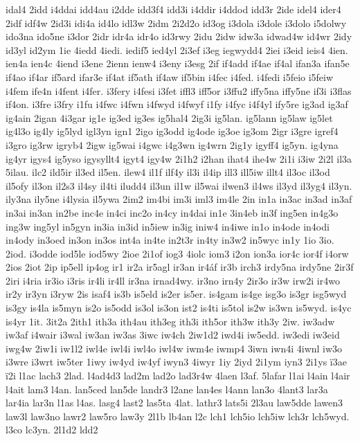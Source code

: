 {idal4
2idd
i4ddai
idd4au
i2dde
idd3f4
idd3i
i4ddir
i4ddod
idd3r
2ide
idel4
ider4
2idf
idf4w
2id3i
idi4a
id4lo
idl3w
2idm
2i2d2o
id3og
i3dola
i3dole
i3dolo
i5dolwy
ido3na
ido5ne
i3dor
2idr
idr4a
idr4o
id3rwy
2idu
2idw
idw3a
idwad4w
id4wr
2idy
id3yl
id2ym
1ie
4iedd
4iedi.
iedif5
ied4yl
2i3ef
i3eg
iegwydd4
2iei
i3eid
ieis4
4ien.
ien4a
ien4c
4iend
i3ene
2ienn
ienw4
i3eny
i3esg
2if
if4add
if4ae
if4al
ifan3a
ifan5e
if4ao
if4ar
if5ard
ifar3e
if4at
if5ath
if4aw
if5bin
i4fec
i4fed.
i4fedi
i5feio
i5feiw
i4fem
ife4n
i4fent
i4fer.
i3fery
i4fesi
i3fet
iffl3
iff5or
i3ffu2
iffy5na
iffy5ne
if3i
i3flas
if4on.
i3fre
i3fry
i1fu
i4fwc
i4fwn
i4fwyd
i4fwyf
i1fy
i4fyc
i4f4yl
ify5re
ig3ad
ig3af
ig4ain
2igan
4i3gar
ig1e
ig3ed
ig3es
ig5hal4
2ig3i
ig5lan.
ig5lann
ig5law
ig5let
ig4l3o
ig4ly
ig5lyd
igl3yn
ign1
2igo
ig3odd
ig4ode
ig3oe
ig3om
2igr
i3gre
igref4
i3gro
ig3rw
igryb4
2igw
ig5wai
i4gwc
i4g3wn
ig4wrn
2ig1y
igyff4
ig5yn.
ig4yna
ig4yr
igys4
ig5yso
igysyllt4
igyt4
igy4w
2i1h2
i2han
ihat4
ihe4w
2i1i
i3iw
2i2l
il3a
5ilau.
ilc2
ild5ir
il3ed
il5en.
ilew4
il1f
ilf4y
il3i
il4ip
ill3
ill5iw
illt4
il3oc
il3od
il5ofy
il3on
il2s3
il4sy
il4ti
iludd4
il3un
il1w
il5wai
ilwen3
il4ws
il3yd
il3yg4
il3yn.
ily3na
ily5ne
i4lysia
il5ywa
2im2
im4bi
im3i
iml3
im4le
2in
in1a
in3ac
in3ad
in3af
in3ai
in3an
in2be
inc4e
in4ci
inc2o
in4cy
in4dai
in1e
3in4eb
in3f
ing5en
in4g3o
ing3w
ing5yl
in5gyn
in3ia
in3id
in5iew
in3ig
iniw4
in4iwe
in1o
in4ode
in4odi
in4ody
in3oed
in3on
in3os
int4a
in4te
in2t3r
in4ty
in3w2
in5wyc
in1y
1io
3io.
2iod.
i3odde
iod5le
iod5wy
2ioe
2i1of
iog3
4iolc
iom3
i2on
ion3a
ior4c
ior4f
i4orw
2ios
2iot
2ip
ip5ell
ip4og
ir1
ir2a
ir5agl
ir3an
ir4^^e1f
ir3b
irch3
irdy5na
irdy5ne
2ir3f
2iri
i4ria
ir3io
i3ris
ir4li
ir4ll
ir3na
irnad4wy.
ir3no
irn4y
2ir3o
ir3w
irw2i
ir4wo
ir2y
ir3yn
i3ryw
2is
isaf4
is3b
is5eld
is2er
is5er.
is4gam
is4ge
isg3o
is3gr
isg5wyd
is3gy
is4la
is5myn
is2o
is5odd
is3ol
is3on
ist2
is4ti
is5tol
is2w
is3wn
is5wyd.
is4yc
is4yr
1it.
3it2a
2ith1
ith3a
ith4au
ith3eg
ith3i
ith5or
ith3w
ith3y
2iw.
iw3adw
iw3af
i4wair
i3wal
iw3an
iw3as
3iwc
iw4ch
2iw1d2
iwd4i
iw5edd.
iw3edi
iw3eid
iwg4w
2iw1i
iw1l2
iwl4e
iwl4i
iwl4o
iwl4w
iwm4e
iwmp4
3iwn
iwn4i
4iwnl
iw3o
i3wre
i3wrt
iw5ter
1iwy
iw4yd
iw4yf
iwyn3
4iwyr
1iy
2iyd
2i1ym
iyn3
2i1ys
^^ef3ae
^^ef2i
l1ac
lach3
2lad.
l4ad4d3
lad2m
lad2o
lad3r4w
4laen
l3af.
5lafar
l1ai
l4ain
l4air
l4ait
lam3
l4an.
lan5ced
lan5de
landr3
l2ane
lan4es
l4ann
lan3o
4lant3
lar3a
lar4ia
lar3n
l1as
l4as.
lasg4
last2
las5ta
4lat.
lathr3
lats5i
2l3au
law5dde
lawen3
law3l
law3no
lawr2
law5ro
law3y
2l1b
lb4an
l2c
lch1
lch5io
lch5iw
lch3r
lch5wyd.
l3co
lc3yn.
2l1d2
ldd2
}
